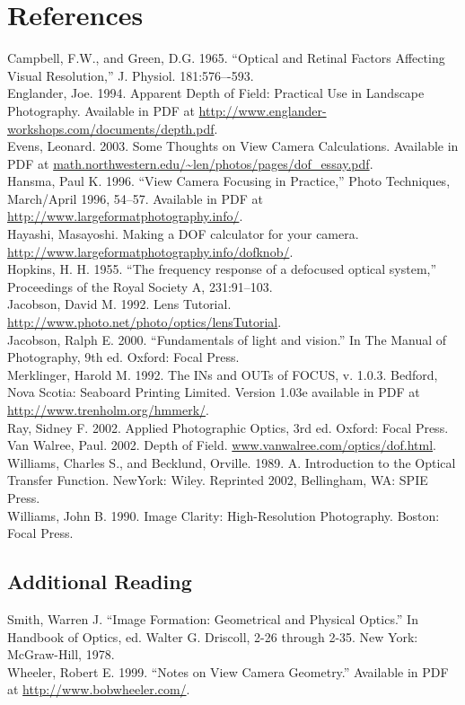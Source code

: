 \documentclass[11pt, oneside]{scrartcl}   	%
\begin{document}
\section{References}

Campbell, F.W., and Green, D.G. 1965. ``Optical and Retinal Factors Affecting Visual Resolution,'' J. Physiol. 181:576–-593.\\
Englander, Joe. 1994. Apparent Depth of Field: Practical Use in Landscape Photography. Available in PDF at \url{http://www.englander-workshops.com/documents/depth.pdf}.\\
Evens, Leonard. 2003. Some Thoughts on View Camera Calculations. Available in PDF at \url{math.northwestern.edu/~len/photos/pages/dof_essay.pdf}.\\
Hansma, Paul K. 1996. ``View Camera Focusing in Practice,'' Photo Techniques, March/April 1996, 54–57. Available in PDF at \url{http://www.largeformatphotography.info/}.\\
Hayashi, Masayoshi. Making a DOF calculator for your camera. \url{http://www.largeformatphotography.info/dofknob/}.\\
Hopkins, H. H. 1955. ``The frequency response of a defocused optical system,'' Proceedings of the Royal Society A, 231:91--103.\\
Jacobson, David M. 1992. Lens Tutorial. \url{http://www.photo.net/photo/optics/lensTutorial}.\\
Jacobson, Ralph E. 2000. ``Fundamentals of light and vision.'' In The Manual of Photography, 9th ed. Oxford: Focal Press.\\
Merklinger, Harold M. 1992. The INs and OUTs of FOCUS, v. 1.0.3. Bedford, Nova Scotia: Seaboard Printing Limited. Version 1.03e available in PDF at \url{http://www.trenholm.org/hmmerk/}.\\
Ray, Sidney F. 2002. Applied Photographic Optics, 3rd ed. Oxford: Focal Press.\\
Van Walree, Paul. 2002. Depth of Field. \url{www.vanwalree.com/optics/dof.html}.\\
Williams, Charles S., and Becklund, Orville. 1989. A. Introduction to the Optical Transfer Function. NewYork: Wiley. Reprinted 2002, Bellingham, WA: SPIE Press.\\
Williams, John B. 1990. Image Clarity: High-Resolution Photography. Boston: Focal Press. 

\subsection{Additional Reading}
Smith, Warren J. ``Image Formation: Geometrical and Physical Optics.'' In Handbook of Optics, ed. Walter G. Driscoll, 2-26 through 2-35. New York: McGraw-Hill, 1978.\\
Wheeler, Robert E. 1999. ``Notes on View Camera Geometry.'' Available in PDF at \url{http://www.bobwheeler.com/}.
\end{document}
